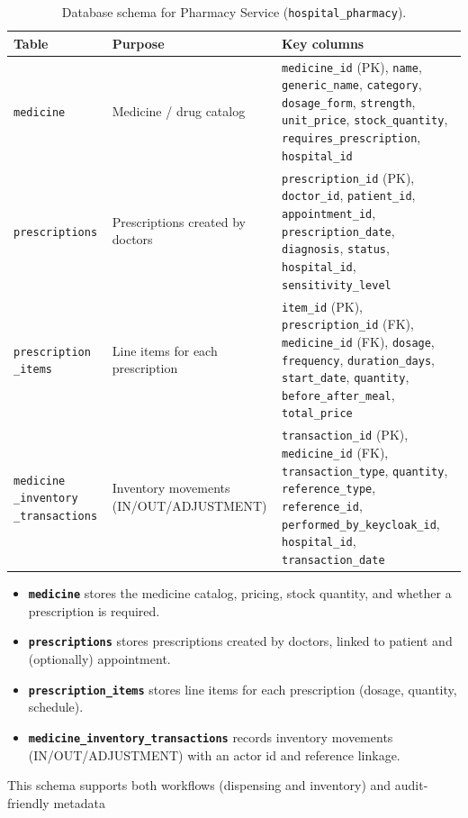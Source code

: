 \begin{table}[H]
\centering
\renewcommand{\arraystretch}{1.2}
\begin{tabular}{|p{3.2cm}|p{5.6cm}|p{5.6cm}|}
\hline
\textbf{Table} & \textbf{Purpose} & \textbf{Key columns} \\
\hline
\texttt{medicine} &
Medicine / drug catalog &
\texttt{medicine\_id} (PK), \texttt{name}, \texttt{generic\_name}, \texttt{category}, \texttt{dosage\_form}, \texttt{strength}, \texttt{unit\_price}, \texttt{stock\_quantity}, \texttt{requires\_prescription}, \texttt{hospital\_id} \\
\hline
\texttt{prescriptions} &
Prescriptions created by doctors &
\texttt{prescription\_id} (PK), \texttt{doctor\_id}, \texttt{patient\_id}, \texttt{appointment\_id}, \texttt{prescription\_date}, \texttt{diagnosis}, \texttt{status}, \texttt{hospital\_id}, \texttt{sensitivity\_level} \\
\hline
\texttt{prescription \_items} &
Line items for each prescription &
\texttt{item\_id} (PK), \texttt{prescription\_id} (FK), \texttt{medicine\_id} (FK), \texttt{dosage}, \texttt{frequency}, \texttt{duration\_days}, \texttt{start\_date}, \texttt{quantity}, \texttt{before\_after\_meal}, \texttt{total\_price} \\
\hline
\texttt{medicine \_inventory \_transactions} &
Inventory movements (IN/OUT/ADJUSTMENT) &
\texttt{transaction\_id} (PK), \texttt{medicine\_id} (FK), \texttt{transaction\_type}, \texttt{quantity}, \texttt{reference\_type}, \texttt{reference\_id}, \texttt{performed\_by\_keycloak\_id}, \texttt{hospital\_id}, \texttt{transaction\_date} \\
\hline
\end{tabular}
\label{tab:db-schema-pharmacy-service}
\caption{Database schema for Pharmacy Service (\texttt{hospital\_pharmacy}).}
\end{table}

\begin{itemize}
  \item \textbf{\texttt{medicine}} stores the medicine catalog, pricing, stock quantity, and whether a prescription is required.
  \item \textbf{\texttt{prescriptions}} stores prescriptions created by doctors, linked to patient and (optionally) appointment.
  \item \textbf{\texttt{prescription\_items}} stores line items for each prescription (dosage, quantity, schedule).
  \item \textbf{\texttt{medicine\_inventory\_transactions}} records inventory movements (IN/OUT/ADJUSTMENT) with an actor id and reference linkage.
\end{itemize}
This schema supports both workflows (dispensing and inventory) and audit-friendly metadata


